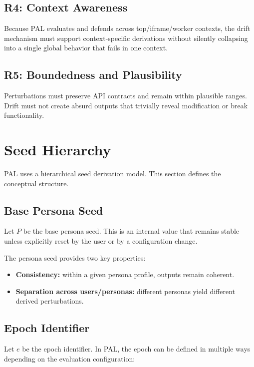 \documentclass[11pt]{report}
\begin{document}
\subsection{R4: Context Awareness}

Because PAL evaluates and defends across top/iframe/worker contexts, the drift mechanism must support context-specific derivations without silently collapsing into a single global behavior that fails in one context.

\subsection{R5: Boundedness and Plausibility}

Perturbations must preserve API contracts and remain within plausible ranges. Drift must not create absurd outputs that trivially reveal modification or break functionality.

\section{Seed Hierarchy}

PAL uses a hierarchical seed derivation model. This section defines the conceptual structure.

\subsection{Base Persona Seed}

Let $P$ be the base persona seed. This is an internal value that remains stable unless explicitly reset by the user or by a configuration change.

The persona seed provides two key properties:
\begin{itemize}
    \item \textbf{Consistency:} within a given persona profile, outputs remain coherent.
    \item \textbf{Separation across users/personas:} different personas yield different derived perturbations.
\end{itemize}

\subsection{Epoch Identifier}

Let $e$ be the epoch identifier. In PAL, the epoch can be defined in multiple ways depending on the evaluation configuration:
\end{document}
